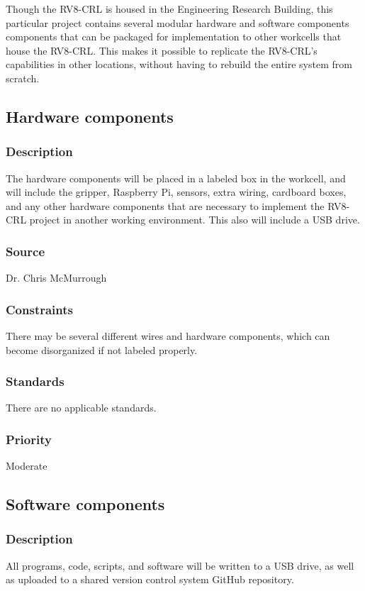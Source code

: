 Though the RV8-CRL is housed in the Engineering Research Building, this particular project contains several modular hardware and software components components that can be packaged for implementation to other workcells that house the RV8-CRL. This makes it possible to replicate the RV8-CRL's capabilities in other locations, without having to rebuild the entire system from scratch.

\subsection{Hardware components}
\subsubsection{Description}
The hardware components will be placed in a labeled box in the workcell, and will include the gripper, Raspberry Pi, sensors, extra wiring, cardboard boxes, and any other hardware components that are necessary to implement the RV8-CRL project in another working environment. This also will include a USB drive.
\subsubsection{Source}
Dr. Chris McMurrough
\subsubsection{Constraints}
There may be several different wires and hardware components, which can become disorganized if not labeled properly.
\subsubsection{Standards}
There are no applicable standards.
\subsubsection{Priority}
Moderate

\subsection{Software components}
\subsubsection{Description}
All programs, code, scripts, and software will be written to a USB drive, as well as uploaded to a shared version control system GitHub repository.
